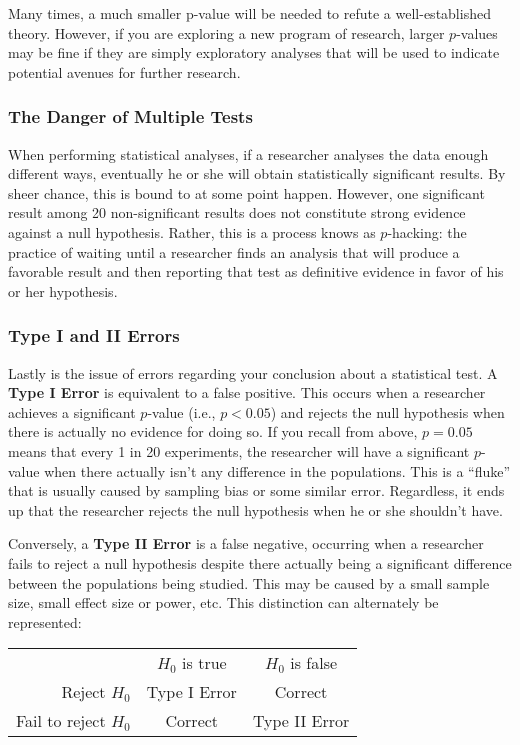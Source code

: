 Many times, a much smaller p-value will be needed to refute a well-established theory. However, if you are exploring a new program of research, larger $p$-values may be fine if they are simply exploratory analyses that will be used to indicate potential avenues for further research.

\subsubsection{The Danger of Multiple Tests}
When performing statistical analyses, if a researcher analyses the data enough different ways, eventually he or she will obtain statistically significant results. By sheer chance, this is bound to at some point happen. However, one significant result among 20 non-significant results does not constitute strong evidence against a null hypothesis. Rather, this is a process knows as $p$-hacking: the practice of waiting until a researcher finds an analysis that will produce a favorable result and then reporting that test as definitive evidence in favor of his or her hypothesis.

\subsubsection{Type I and II Errors}
Lastly is the issue of errors regarding your conclusion about a statistical test. A \textbf{Type I Error} is equivalent to a false positive. This occurs when a researcher achieves a significant $p$-value (i.e., $p<0.05$) and rejects the null hypothesis when there is actually no evidence for doing so. If you recall from above, $p=0.05$ means that every 1 in 20 experiments, the researcher will have a significant $p$-value when there actually isn't any difference in the populations. This is a ``fluke'' that is usually caused by sampling bias or some similar error. Regardless, it ends up that the researcher rejects the null hypothesis when he or she shouldn't have.

Conversely, a \textbf{Type II Error} is a false negative, occurring when a researcher fails to reject a null hypothesis despite there actually being a significant difference between the populations being studied. This may be caused by a small sample size, small effect size or power, etc. This distinction can alternately be represented:

\begin{center}
\begin{tabular}{|r c c|}
\hline
& $H_0$ is true & $H_0$ is false \\
 Reject $H_0$ & Type I Error & Correct\\
Fail to reject $H_0$ & Correct & Type II Error\\
\hline
\end{tabular}
\end{center}

